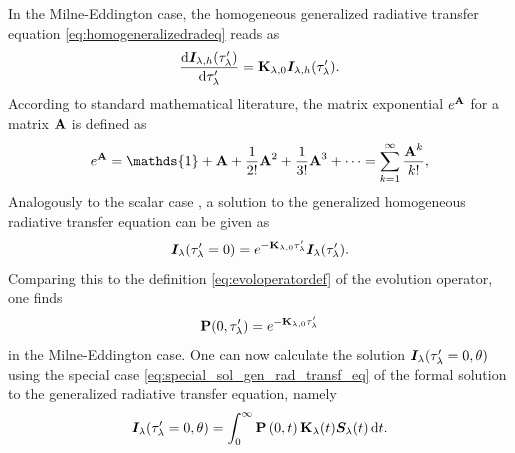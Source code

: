 \documentclass[a4paper,11pt]{report}
\def\lk#1{{\color{black}{#1}}}
\begin{document}
In the Milne-Eddington case, the homogeneous generalized radiative transfer equation \cref{eq:homogeneralizedradeq} reads as \begin{equation}
\frac{\mathrm{d}\bm{I}_{\lambda,h}(\tau_\lambda^\prime)}{\mathrm{d}\tau_\lambda^\prime} = \boldsymbol{\mathbf{K}}_{\lambda,0}\bm{I}_{\lambda,h}(\tau_\lambda^\prime).
\end{equation} According to standard mathematical literature, the matrix exponential $e^{\boldsymbol{\mathbf{A}}}$ for a matrix $\boldsymbol{\mathbf{A}}$ is defined as \begin{equation}
e^{\matr{A}} = \mathds{1} + \matr{A} + \frac{1}{2!}\matr{A}^2 + \frac{1}{3!}\matr{A}^3 + \dots = \sum_{k=1}^{\infty}\frac{\matr{A}^k}{k!},
\end{equation} Analogously to the scalar case \lk{therefore}, a solution to the generalized homogeneous radiative transfer equation can be given as \begin{equation}
\bm{I}_\lambda(\tau_\lambda^\prime = 0) = e^{-\boldsymbol{\mathbf{K}}_{\lambda,0}\tau_\lambda^\prime}\bm{I}_\lambda(\tau_\lambda^\prime).
\end{equation} Comparing this to the definition \cref{eq:evoloperatordef} of the evolution operator, one finds \begin{equation}
\boldsymbol{\mathbf{P}}(0,\tau_\lambda^\prime) = e^{-\boldsymbol{\mathbf{K}}_{\lambda,0}\tau_\lambda^\prime}
\end{equation} in the Milne-Eddington case. One can now calculate the solution $\bm{I}_\lambda(\tau_\lambda^\prime=0, \theta)$ using the special case \cref{eq:special_sol_gen_rad_transf_eq} of the formal solution to the generalized radiative transfer equation, namely 
\begin{equation}
\bm{I}_\lambda(\tau_\lambda^\prime = 0,\theta) = \int_{0}^{ \infty}\boldsymbol{\mathbf{P}}\left(0,t\right)\boldsymbol{\mathbf{K}}_\lambda(t)\bm{S}_\lambda(t)\,\mathrm{d}t.
\end{equation}
\end{document}
